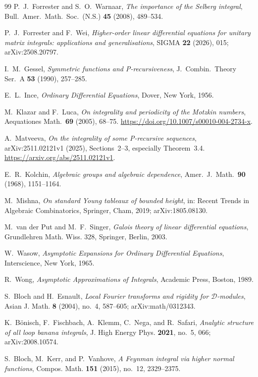 \documentclass[11pt,a4paper]{article}
\theoremstyle{definition}
\theoremstyle{remark}
\numberwithin{equation}{section}
\begin{document}
\begin{thebibliography}{99}
P.~J.~Forrester and S.~O.~Warnaar,
\emph{The importance of the Selberg integral},
Bull.\ Amer.\ Math.\ Soc.\ (N.S.) \textbf{45} (2008), 489--534.

P.~J.~Forrester and F.~Wei,
\emph{Higher-order linear differential equations for unitary matrix integrals: applications and generalisations},
SIGMA \textbf{22} (2026), 015; arXiv:2508.20797.

I.~M.~Gessel,
\emph{Symmetric functions and P-recursiveness},
J.\ Combin.\ Theory Ser.~A \textbf{53} (1990), 257--285.

E.~L.~Ince,
\emph{Ordinary Differential Equations},
Dover, New York, 1956.

M.~Klazar and F.~Luca,
\emph{On integrality and periodicity of the Motzkin numbers},
Aequationes Math.\ \textbf{69} (2005), 68--75.
\url{https://doi.org/10.1007/s00010-004-2734-x}.

A.~Matveeva,
\emph{On the integrality of some P-recursive sequences},
arXiv:2511.02121v1 (2025), Sections~2--3, especially Theorem~3.4.
\url{https://arxiv.org/abs/2511.02121v1}.

E.~R.~Kolchin,
\emph{Algebraic groups and algebraic dependence},
Amer.\ J.\ Math.\ \textbf{90} (1968), 1151--1164.

M.~Mishna,
\emph{On standard Young tableaux of bounded height},
in: Recent Trends in Algebraic Combinatorics, Springer, Cham, 2019; arXiv:1805.08130.

M.~van der Put and M.~F.~Singer,
\emph{Galois theory of linear differential equations},
Grundlehren Math. Wiss. 328, Springer, Berlin, 2003.

W.~Wasow,
\emph{Asymptotic Expansions for Ordinary Differential Equations},
Interscience, New York, 1965.

R.~Wong,
\emph{Asymptotic Approximations of Integrals},
Academic Press, Boston, 1989.

S.~Bloch and H.~Esnault,
\emph{Local Fourier transforms and rigidity for $\mathcal D$-modules},
Asian J. Math. \textbf{8} (2004), no.~4, 587--605; arXiv:math/0312343.

K.~B\"onisch, F.~Fischbach, A.~Klemm, C.~Nega, and R.~Safari,
\emph{Analytic structure of all loop banana integrals},
J. High Energy Phys. \textbf{2021}, no.~5, 066; arXiv:2008.10574.

S.~Bloch, M.~Kerr, and P.~Vanhove,
\emph{A Feynman integral via higher normal functions},
Compos. Math. \textbf{151} (2015), no.~12, 2329--2375.


\end{thebibliography}
\end{document}
